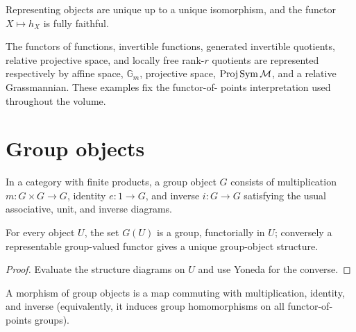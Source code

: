 \begin{remark}\label{fga-rem-2-4}
Representing objects are unique up to a unique isomorphism, and the functor
$X\mapsto h_X$ is fully faithful.
\end{remark}

The functors of functions, invertible functions, generated invertible quotients,
relative projective space, and locally free rank-$r$ quotients are represented
respectively by affine space, $\mathbb G_m$, projective space, $\operatorname{Proj}\operatorname{Sym}
\mathcal M$, and a relative Grassmannian.  These examples fix the functor-of-
points interpretation used throughout the volume.

\section{Group objects}

\begin{definition}\label{fga-def-2-11}\uses{}
In a category with finite products, a group object $G$ consists of multiplication
$m:G\times G\to G$, identity $e:1\to G$, and inverse $i:G\to G$ satisfying
the usual associative, unit, and inverse diagrams.
\end{definition}\begin{proposition}\label{fga-prop-2-12}
For every object $U$, the set $G(U)$ is a group, functorially in $U$; conversely
a representable group-valued functor gives a unique group-object structure.
\end{proposition}
\begin{proof}
Evaluate the structure diagrams on $U$ and use Yoneda for the converse.
\end{proof}

\begin{definition}\label{fga-def-2-13}
A morphism of group objects is a map commuting with multiplication, identity,
and inverse (equivalently, it induces group homomorphisms on all functor-of-
points groups).
\end{definition}

